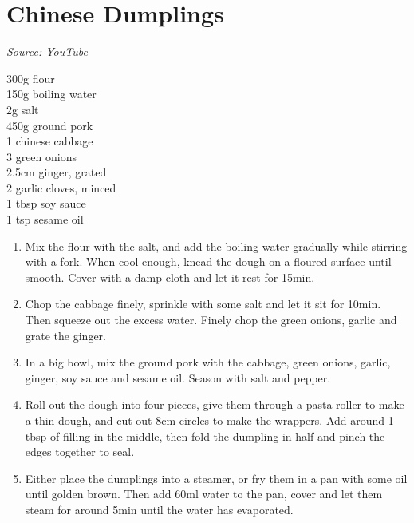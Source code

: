 \documentclass{report}
\begin{document}
\section{Chinese Dumplings}
\textit{Source: YouTube}\\
\begin{minipage}[t]{0.21\textwidth} \vspace{0pt} 
300g flour\\
150g boiling water\\
2g salt\\

450g ground pork\\
1 chinese cabbage\\
3 green onions\\
2.5cm ginger, grated\\
2 garlic cloves, minced\\
1 tbsp soy sauce\\
1 tsp sesame oil\\
\end{minipage}
\hfill
\begin{minipage}[t]{0.78\textwidth} \vspace{0pt}
	\begin{enumerate}
		\item Mix the flour with the salt, and add the boiling water gradually while stirring with a fork. When cool enough, knead the dough on a floured surface until smooth. Cover with a damp cloth and let it rest for 15min.
		\item Chop the cabbage finely, sprinkle with some salt and let it sit for 10min. Then squeeze out the excess water. Finely chop the green onions, garlic and grate the ginger.
		\item In a big bowl, mix the ground pork with the cabbage, green onions, garlic, ginger, soy sauce and sesame oil. Season with salt and pepper.
		\item Roll out the dough into four pieces, give them through a pasta roller to make a thin dough, and cut out 8cm circles to make the wrappers. Add around 1 tbsp of filling in the middle, then fold the dumpling in half and pinch the edges together to seal.
		\item Either place the dumplings into a steamer, or fry them in a pan with some oil until golden brown. Then add 60ml water to the pan, cover and let them steam for around 5min until the water has evaporated.   
	\end{enumerate}	
\end{minipage}
\end{document}
